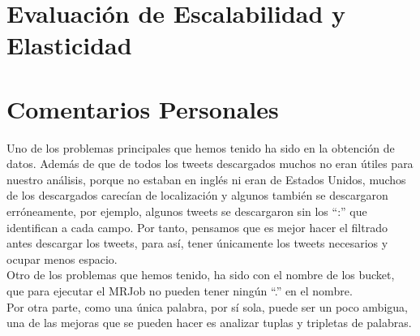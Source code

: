 \documentclass[12pt,a4paper]{article}
\begin{document}
\section{Evaluación de Escalabilidad y Elasticidad}

\section{Comentarios Personales}

Uno de los problemas principales que hemos tenido ha sido en la obtención de datos. Además de que de todos los tweets descargados muchos no eran útiles para nuestro análisis, porque no estaban en inglés ni eran de Estados Unidos, muchos de los descargados carecían de localización y algunos también se descargaron erróneamente, por ejemplo, algunos tweets se descargaron sin los ``:'' que identifican a cada campo. Por tanto, pensamos que es mejor hacer el filtrado antes descargar los tweets, para así, tener únicamente los tweets necesarios y ocupar menos espacio.\\

Otro de los problemas que hemos tenido, ha sido con el nombre de los bucket, que para ejecutar el MRJob no pueden tener ningún ``.'' en el nombre.\\

Por otra parte, como una única palabra, por sí sola, puede ser un poco ambigua, una de las mejoras que se pueden hacer es analizar tuplas y tripletas de palabras.\\
\end{document}
